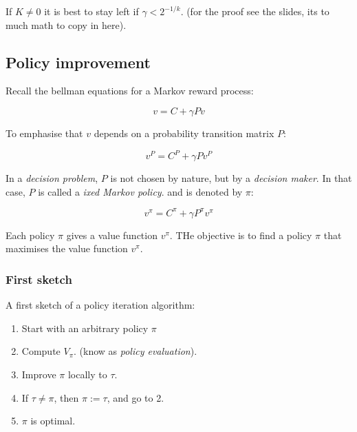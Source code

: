 \documentclass{article}
\begin{document}
\begin{center}
\end{center}

If $K \ne 0$ it is best to stay left if $\gamma < 2^{-1/k}$. (for the
proof see the slides, its to much math to copy in here).

\subsection{Policy improvement}

Recall the bellman equations for a Markov reward process:

\[ v = C+\gamma P v\]

To emphasise that $v$ depends on a probability transition matrix $P$:

\[ v^P = C^P + \gamma P v^P\]

In a \emph{decision problem}, $P$ is not chosen by nature, but by a 
\emph{decision maker}. In that case, $P$ is called a \emph{ixed Markov
policy}. and is denoted by $\pi$:

\[ v^\pi = C^\pi + \gamma P^\pi v^\pi\]

Each policy $\pi$ gives a value function $v^\pi$. THe objective is to find a
policy $\pi$ that maximises the value function $v^\pi$.

\subsubsection{First sketch}
A first sketch of a policy iteration algorithm:
\begin{enumerate}
	\item Start with an arbitrary policy $\pi$
	\item Compute $V_\pi$. (know as \emph{policy evaluation}).
	\item Improve $\pi$ locally to $\tau$.
	\item If $\tau \ne \pi$, then $\pi := \tau$, and go to 2.
	\item $\pi$ is optimal.
\end{enumerate}
\end{document}
